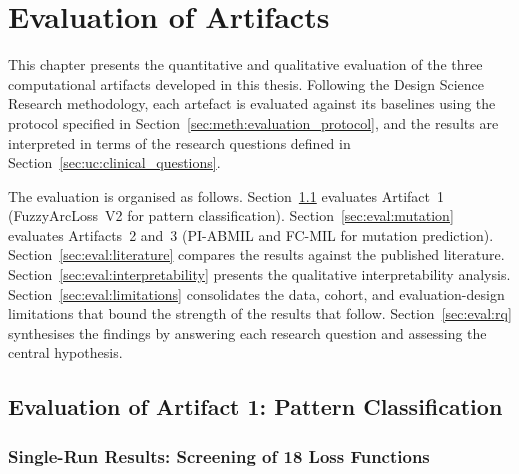 
\chapter{Evaluation of Artifacts}
\label{ch:evaluation}

This chapter presents the quantitative and qualitative evaluation of the three computational artifacts developed in this thesis.
Following the Design Science Research methodology, each artefact is evaluated against its baselines using the protocol specified in Section~\ref{sec:meth:evaluation_protocol}, and the results are interpreted in terms of the research questions defined in Section~\ref{sec:uc:clinical_questions}.

The evaluation is organised as follows.
Section~\ref{sec:eval:pattern} evaluates Artifact~1
(FuzzyArcLoss~V2 for pattern classification).
Section~\ref{sec:eval:mutation} evaluates Artifacts~2 and~3
(PI-ABMIL and FC-MIL for mutation prediction).
Section~\ref{sec:eval:literature} compares the results against the
published literature.
Section~\ref{sec:eval:interpretability} presents the qualitative
interpretability analysis.
Section~\ref{sec:eval:limitations} consolidates the data, cohort,
and evaluation-design limitations that bound the strength of the
results that follow.
Section~\ref{sec:eval:rq} synthesises the findings by answering each
research question and assessing the central hypothesis.


\section{Evaluation of Artifact 1: Pattern Classification}
\label{sec:eval:pattern}

\subsection{Single-Run Results: Screening of 18 Loss Functions}
\label{sec:eval:pattern:singlerun}

